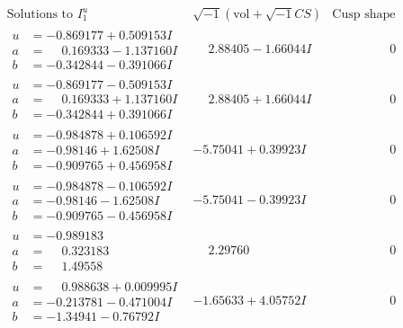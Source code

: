 \documentclass[1p]{elsarticle_modified}
\theoremstyle{definition}
\newcommand{\I}{\sqrt{-1}}
\begin{document}
$$\begin{array}{c|c|c}  
\text{Solutions to }I^u_{1}& \I (\text{vol} + \sqrt{-1}CS) & \text{Cusp shape}\\
 \hline 
\begin{aligned}
u &= -0.869177 + 0.509153 I \\
a &= \phantom{-}0.169333 - 1.137160 I \\
b &= -0.342844 - 0.391066 I\end{aligned}
 & \phantom{-}2.88405 - 1.66044 I & \phantom{-0.000000 } 0 \\ \hline\begin{aligned}
u &= -0.869177 - 0.509153 I \\
a &= \phantom{-}0.169333 + 1.137160 I \\
b &= -0.342844 + 0.391066 I\end{aligned}
 & \phantom{-}2.88405 + 1.66044 I & \phantom{-0.000000 } 0 \\ \hline\begin{aligned}
u &= -0.984878 + 0.106592 I \\
a &= -0.98146 + 1.62508 I \\
b &= -0.909765 + 0.456958 I\end{aligned}
 & -5.75041 + 0.39923 I & \phantom{-0.000000 } 0 \\ \hline\begin{aligned}
u &= -0.984878 - 0.106592 I \\
a &= -0.98146 - 1.62508 I \\
b &= -0.909765 - 0.456958 I\end{aligned}
 & -5.75041 - 0.39923 I & \phantom{-0.000000 } 0 \\ \hline\begin{aligned}
u &= -0.989183\phantom{ +0.000000I} \\
a &= \phantom{-}0.323183\phantom{ +0.000000I} \\
b &= \phantom{-}1.49558\phantom{ +0.000000I}\end{aligned}
 & \phantom{-}2.29760\phantom{ +0.000000I} & \phantom{-0.000000 } 0 \\ \hline\begin{aligned}
u &= \phantom{-}0.988638 + 0.009995 I \\
a &= -0.213781 - 0.471004 I \\
b &= -1.34941 - 0.76792 I\end{aligned}
 & -1.65633 + 4.05752 I & \phantom{-0.000000 } 0 \\ \hline\begin{aligned}

\end{aligned}
\end{array}$$
\end{document}
